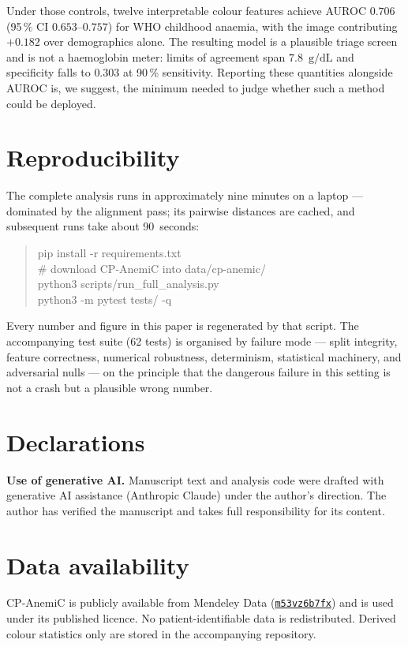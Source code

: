 \documentclass[11pt,a4paper]{article}
\newcommand{\gdl}{\ensuremath{\mathrm{g/dL}}}
\newcommand{\auroc}{AUROC}
\begin{document}
Under those controls, twelve interpretable colour features achieve \auroc{} $0.706$
(95\,\% CI $0.653$--$0.757$) for WHO childhood anaemia, with the image contributing $+0.182$
over demographics alone. The resulting model is a plausible triage screen and is not a
haemoglobin meter: limits of agreement span $7.8$~\gdl{} and specificity falls to $0.303$ at
90\,\% sensitivity. Reporting these quantities alongside \auroc{} is, we suggest, the minimum
needed to judge whether such a method could be deployed.

\section*{Reproducibility}

The complete analysis runs in approximately nine minutes on a laptop --- dominated by the
alignment pass; its pairwise distances are cached, and subsequent runs take about 90~seconds:

\begin{quote}\ttfamily\small
pip install -r requirements.txt\\
\# download CP-AnemiC into data/cp-anemic/\\
python3 scripts/run\_full\_analysis.py\\
python3 -m pytest tests/ -q
\end{quote}

Every number and figure in this paper is regenerated by that script. The accompanying test
suite (62 tests) is organised by failure mode --- split integrity, feature correctness,
numerical robustness, determinism, statistical machinery, and adversarial nulls --- on the
principle that the dangerous failure in this setting is not a crash but a plausible wrong
number.

\section*{Declarations}

\noindent\textbf{Use of generative AI.} Manuscript text and analysis code were drafted with
generative AI assistance (Anthropic Claude) under the author's direction. The author has verified
the manuscript and takes full responsibility for its content.

\section*{Data availability}

CP-AnemiC is publicly available from Mendeley Data
(\href{https://data.mendeley.com/datasets/m53vz6b7fx/1}{\texttt{m53vz6b7fx}})
\cite{asare2023cpanemic} and is used under its published licence. No patient-identifiable
data is redistributed. Derived colour statistics only are stored in the accompanying
repository.
\end{document}
